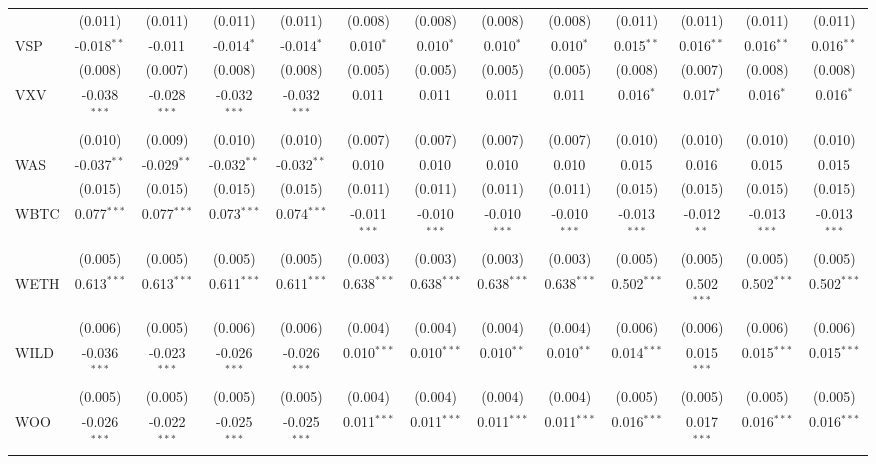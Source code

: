 \begin{table}[!htbp]
\begin{tabular}{@{\extracolsep{5pt}}lcccccccccccc}
  & (0.011) & (0.011) & (0.011) & (0.011) & (0.008) & (0.008) & (0.008) & (0.008) & (0.011) & (0.011) & (0.011) & (0.011) \\
 VSP & -0.018$^{**}$ & -0.011$^{}$ & -0.014$^{*}$ & -0.014$^{*}$ & 0.010$^{*}$ & 0.010$^{*}$ & 0.010$^{*}$ & 0.010$^{*}$ & 0.015$^{**}$ & 0.016$^{**}$ & 0.016$^{**}$ & 0.016$^{**}$ \\
  & (0.008) & (0.007) & (0.008) & (0.008) & (0.005) & (0.005) & (0.005) & (0.005) & (0.008) & (0.007) & (0.008) & (0.008) \\
 VXV & -0.038$^{***}$ & -0.028$^{***}$ & -0.032$^{***}$ & -0.032$^{***}$ & 0.011$^{}$ & 0.011$^{}$ & 0.011$^{}$ & 0.011$^{}$ & 0.016$^{*}$ & 0.017$^{*}$ & 0.016$^{*}$ & 0.016$^{*}$ \\
  & (0.010) & (0.009) & (0.010) & (0.010) & (0.007) & (0.007) & (0.007) & (0.007) & (0.010) & (0.010) & (0.010) & (0.010) \\
 WAS & -0.037$^{**}$ & -0.029$^{**}$ & -0.032$^{**}$ & -0.032$^{**}$ & 0.010$^{}$ & 0.010$^{}$ & 0.010$^{}$ & 0.010$^{}$ & 0.015$^{}$ & 0.016$^{}$ & 0.015$^{}$ & 0.015$^{}$ \\
  & (0.015) & (0.015) & (0.015) & (0.015) & (0.011) & (0.011) & (0.011) & (0.011) & (0.015) & (0.015) & (0.015) & (0.015) \\
 WBTC & 0.077$^{***}$ & 0.077$^{***}$ & 0.073$^{***}$ & 0.074$^{***}$ & -0.011$^{***}$ & -0.010$^{***}$ & -0.010$^{***}$ & -0.010$^{***}$ & -0.013$^{***}$ & -0.012$^{**}$ & -0.013$^{***}$ & -0.013$^{***}$ \\
  & (0.005) & (0.005) & (0.005) & (0.005) & (0.003) & (0.003) & (0.003) & (0.003) & (0.005) & (0.005) & (0.005) & (0.005) \\
 WETH & 0.613$^{***}$ & 0.613$^{***}$ & 0.611$^{***}$ & 0.611$^{***}$ & 0.638$^{***}$ & 0.638$^{***}$ & 0.638$^{***}$ & 0.638$^{***}$ & 0.502$^{***}$ & 0.502$^{***}$ & 0.502$^{***}$ & 0.502$^{***}$ \\
  & (0.006) & (0.005) & (0.006) & (0.006) & (0.004) & (0.004) & (0.004) & (0.004) & (0.006) & (0.006) & (0.006) & (0.006) \\
 WILD & -0.036$^{***}$ & -0.023$^{***}$ & -0.026$^{***}$ & -0.026$^{***}$ & 0.010$^{***}$ & 0.010$^{***}$ & 0.010$^{**}$ & 0.010$^{**}$ & 0.014$^{***}$ & 0.015$^{***}$ & 0.015$^{***}$ & 0.015$^{***}$ \\
  & (0.005) & (0.005) & (0.005) & (0.005) & (0.004) & (0.004) & (0.004) & (0.004) & (0.005) & (0.005) & (0.005) & (0.005) \\
 WOO & -0.026$^{***}$ & -0.022$^{***}$ & -0.025$^{***}$ & -0.025$^{***}$ & 0.011$^{***}$ & 0.011$^{***}$ & 0.011$^{***}$ & 0.011$^{***}$ & 0.016$^{***}$ & 0.017$^{***}$ & 0.016$^{***}$ & 0.016$^{***}$ \\

\end{tabular}
\end{table}
